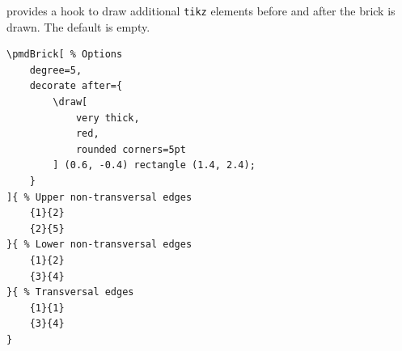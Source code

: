 \documentclass{ltxdoc}
\begin{document}
provides a hook to draw additional \texttt{tikz} elements before and after the brick is drawn. The default is empty.
\begin{center}
    \begin{minipage}{\dimexpr0.85\textwidth-2\fboxrule-2\fboxsep\relax}
        \begin{minipage}[c]{0.4\linewidth}
\begin{verbatim}
\pmdBrick[ % Options
    degree=5,
    decorate after={
        \draw[
            very thick,
            red,
            rounded corners=5pt
        ] (0.6, -0.4) rectangle (1.4, 2.4);
    }
]{ % Upper non-transversal edges
    {1}{2}
    {2}{5}
}{ % Lower non-transversal edges
    {1}{2}
    {3}{4}
}{ % Transversal edges
    {1}{1}
    {3}{4}
}
\end{verbatim}
        \end{minipage}
        \hfill
        \begin{minipage}[c]{0.4\linewidth}
        \end{minipage}
    \end{minipage}%
\end{center}
\begin{center}
\end{center}
\end{document}
